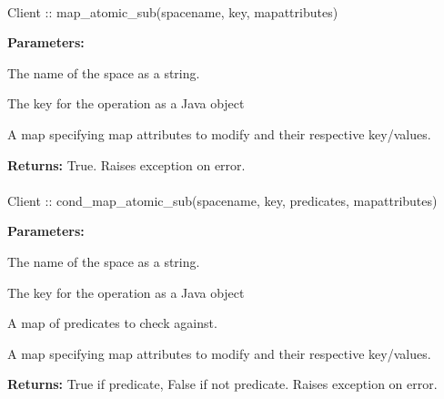 \paragraph{}
\label{api:java:map_atomic_sub}
\begin{javacode}
Client :: map_atomic_sub(spacename, key, mapattributes)
\end{javacode}


\noindent\textbf{Parameters:}
\begin{description}[labelindent=\widthof{{\code{mapattributes}}},leftmargin=*,noitemsep,nolistsep,align=right]
\item[\code{spacename}] The name of the space as a string.
\item[\code{key}] The key for the operation as a Java object
\item[\code{mapattributes}] A map specifying map attributes to modify and their respective key/values.
\end{description}

\noindent\textbf{Returns:}
True.  Raises exception on error.

\paragraph{}
\label{api:java:cond_map_atomic_sub}
\begin{javacode}
Client :: cond_map_atomic_sub(spacename, key, predicates, mapattributes)
\end{javacode}


\noindent\textbf{Parameters:}
\begin{description}[labelindent=\widthof{{\code{mapattributes}}},leftmargin=*,noitemsep,nolistsep,align=right]
\item[\code{spacename}] The name of the space as a string.
\item[\code{key}] The key for the operation as a Java object
\item[\code{predicates}] A map of predicates to check against.
\item[\code{mapattributes}] A map specifying map attributes to modify and their respective key/values.
\end{description}

\noindent\textbf{Returns:}
True if predicate, False if not predicate.  Raises exception on error.

